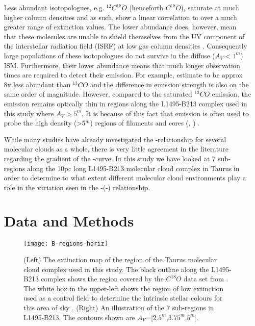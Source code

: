 \documentclass{aa}
\begin{document}
Less abundant isotopologues, e.g. $^{12}C^{18}O$ (henceforth $C^{18}O$), saturate at much higher \htwo column densities and as such, show a linear correlation to \nhtwo over a much greater range of extinction values. The lower abundance does, however, mean that these molecules are unable to shield themselves from the UV component of the interstellar radiation field (ISRF) at low gas column densities \citep{vanDishoeck88}. Consequently large populations of these isotopologues do not survive in the diffuse ($A_V<1^m$) ISM. Furthermore, their lower abundance means that much longer observation times are required to detect their emission. For example, \citet{wilson94} estimate \eco to be approx 8x less abundant than $^{13}CO$ and the difference in emission strength is also on the same order of magnitude. However, compared to the saturated $^{13}CO$ emission, the \eco emission remains optically thin in regions along the L1495-B213 complex used in this study where $A_V>5^m$. It is because of this fact that \eco emission is often used to probe the high density (\av>5$^m$) regions of filaments and cores (\citealt{onishi96}, \citealt{kainulainen06}) .

While many studies have already investigated the \neco-\av relationship for several molecular clouds as a whole, there is very little agreement in the literature regarding the gradient of the \neco-\av curve. In this study we have looked at 7 sub-regions along the 10pc long L1495-B213 molecular cloud complex in Taurus in order to determine to what extent different molecular cloud environments play a role in the variation seen in the \eco-\av (\eco-\htwo) relationship.



\section{Data and Methods}

    \begin{figure*}
    \centering
    \texttt{[image: B-regions-horiz]}
    \caption{(Left) The extinction map of the region of the Taurus molecular cloud complex used in this study. The black outline along the L1495-B213 complex shows the region covered by the $C^{18}O$ data set from \citet{hacar13}. The white box in the upper-left shows the region of low extinction used as a control field to determine the intrinsic stellar colours for this area of sky \citep{nicer}.  (Right) An illustration of the 7 sub-regions in L1495-B213. The contours shown are $A_V$=[$2.5^m$,$3.75^m$,$5^m$].}
    \label{Avmap}
    \end{figure*}
\end{document}
